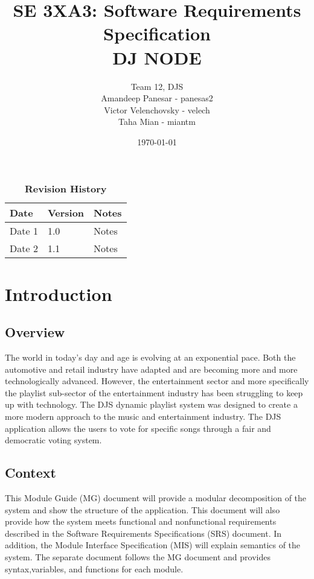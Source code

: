 \documentclass[12pt, titlepage]{article}
\title{SE 3XA3: Software Requirements Specification\\DJ NODE}
\author{Team 12, DJS
		\\ Amandeep Panesar - panesas2
		\\ Victor Velenchovsky - velech
		\\ Taha Mian - miantm
}
\date{\today}
\begin{document}
\maketitle


\tableofcontents
\listoftables
\listoffigures


\begin{table}[h]
\caption{\bf Revision History}
\begin{tabularx}{\textwidth}{p{3cm}p{2cm}X}
\toprule {\bf Date} & {\bf Version} & {\bf Notes}\\
\midrule
Date 1 & 1.0 & Notes\\
Date 2 & 1.1 & Notes\\
\bottomrule


\end{tabularx}
\end{table}


\newpage




\section{Introduction}
\subsection{Overview}
The world in today's day and age is evolving at an exponential pace. Both the automotive and retail industry have adapted and are becoming more and more technologically advanced. However, the entertainment sector and more specifically the playlist sub-sector of the entertainment industry has been struggling to keep up with technology. The DJS dynamic playlist system was designed to create a more modern approach to the music and entertainment industry. The DJS application allows the users to vote for specific songs through a fair and democratic voting system.
\subsection{Context}
This Module Guide (MG) document will provide a modular decomposition of the system and show the structure of the application. This document will also provide how the system meets functional and nonfunctional requirements described in the Software Requirements Specifications (SRS) document. In addition, the Module Interface Specification (MIS) will explain semantics of the system. The separate document follows the MG document and provides syntax,variables, and functions for each module.
\end{document}
